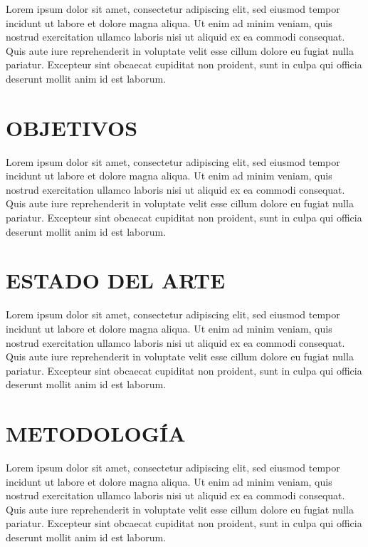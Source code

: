 \documentclass[12pt,a4paper,twoside]{article} %
\begin{document}
Lorem ipsum dolor sit amet, consectetur adipiscing elit, sed eiusmod tempor incidunt ut labore et dolore magna aliqua. Ut enim ad minim veniam, quis nostrud exercitation ullamco laboris nisi ut aliquid ex ea commodi consequat. Quis aute iure reprehenderit in voluptate velit esse cillum dolore eu fugiat nulla pariatur. Excepteur sint obcaecat cupiditat non proident, sunt in culpa qui officia deserunt mollit anim id est laborum.


\section{OBJETIVOS}
\label{sec:objetivos}

Lorem ipsum dolor sit amet, consectetur adipiscing elit, sed eiusmod tempor incidunt ut labore et dolore magna aliqua. Ut enim ad minim veniam, quis nostrud exercitation ullamco laboris nisi ut aliquid ex ea commodi consequat. Quis aute iure reprehenderit in voluptate velit esse cillum dolore eu fugiat nulla pariatur. Excepteur sint obcaecat cupiditat non proident, sunt in culpa qui officia deserunt mollit anim id est laborum.


\section{ESTADO DEL ARTE}
\label{sec:stateofart}

Lorem ipsum dolor sit amet, consectetur adipiscing elit, sed eiusmod tempor incidunt ut labore et dolore magna aliqua. Ut enim ad minim veniam, quis nostrud exercitation ullamco laboris nisi ut aliquid ex ea commodi consequat. Quis aute iure reprehenderit in voluptate velit esse cillum dolore eu fugiat nulla pariatur. Excepteur sint obcaecat cupiditat non proident, sunt in culpa qui officia deserunt mollit anim id est laborum.


\section{METODOLOGÍA}
\label{sec:metodologias}

Lorem ipsum dolor sit amet, consectetur adipiscing elit, sed eiusmod tempor incidunt ut labore et dolore magna aliqua. Ut enim ad minim veniam, quis nostrud exercitation ullamco laboris nisi ut aliquid ex ea commodi consequat. Quis aute iure reprehenderit in voluptate velit esse cillum dolore eu fugiat nulla pariatur. Excepteur sint obcaecat cupiditat non proident, sunt in culpa qui officia deserunt mollit anim id est laborum.
\end{document}
